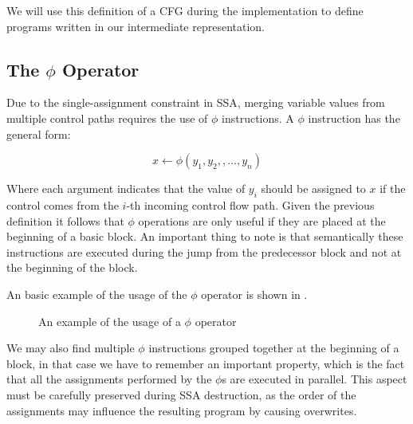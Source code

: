 We will use this definition of a CFG during the implementation to define programs written in our intermediate representation.

\subsection{The $\phi$ Operator}
\label{subsec:phi}

Due to the single-assignment constraint in SSA, merging variable values from multiple control paths requires the use of $\phi$ instructions. A $\phi$ instruction has the general form:

\[
x \leftarrow \phi(y_1, y_2, , \dots, y_n)
\]

Where each argument indicates that the value of $y_i$ should be assigned to $x$ if the control comes from the $i$-th incoming control flow path. Given the previous definition it follows that $\phi$ operations are only useful if they are placed at the beginning of a basic block. An important thing to note is that semantically these instructions are executed during the jump from the predecessor block and not at the beginning of the block.

An basic example of the usage of the $\phi$ operator is shown in .

\begin{figure}[ht]
    \centering
    \caption{An example of the usage of a $\phi$ operator}
    \label{fig:phi-usage}
\end{figure}

We may also find multiple $\phi$ instructions grouped together at the beginning of a block, in that case we have to remember an important property, which is the fact that all the assignments performed by the $\phi$s are executed in parallel. This aspect must be carefully preserved during SSA destruction, as the order of the assignments may influence the resulting program by causing overwrites.

